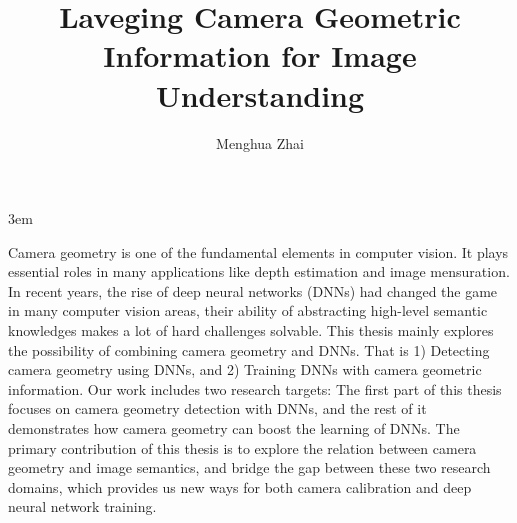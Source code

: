 \documentclass[final]{ukthesis}
\newcommand{\disstitle}{Laveging Camera Geometric Information for
Image Understanding}
\begin{document}
\emergencystretch 3em

\author{Menghua Zhai}
\title{\disstitle}

\abstract
{
  \SingleSpacing
  Camera geometry is one of the fundamental elements in computer vision.
  It plays essential roles in many applications like depth estimation
  and image mensuration. 
  In recent years, the rise of deep neural networks (DNNs) had changed
  the game in many computer vision areas, their ability of abstracting
  high-level semantic knowledges makes a lot of hard challenges
  solvable. 
  This thesis mainly explores the possibility of combining camera
  geometry and DNNs. That is 1) Detecting camera geometry using DNNs,
  and 2) Training DNNs with camera geometric information.  Our work
  includes two research targets: The first part of this thesis focuses
  on camera geometry detection with DNNs, and the rest of it
  demonstrates how camera geometry can boost the learning of DNNs.
  The primary contribution of this thesis is to explore the relation
  between camera geometry and image semantics, and bridge the gap
  between these two research domains, which provides us new ways for
  both camera calibration and deep neural network training.
}


\frontmatter
\maketitle



\tableofcontents\clearpage

\mainmatter




\backmatter




\end{document}
